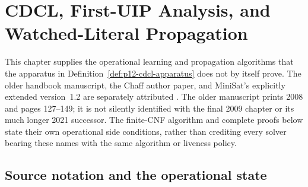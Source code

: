 \chapter{CDCL, First-UIP Analysis, and Watched-Literal Propagation}
\label{sec:p12-cdcl-uip-and-watched-literals}

This chapter supplies the operational learning and propagation algorithms that
the apparatus in Definition~\ref{def:p12-cdcl-apparatus} does not by itself
prove.  The older handbook manuscript, the Chaff author paper, and MiniSat's
explicitly extended version~1.2 are separately attributed
\cite{MarquesSilvaLynceMalik2008CDCLManuscript,MoskewiczEtAl2001ChaffV56,EenSorenssonMiniSatExtended12}.
The older manuscript prints 2008 and pages 127--149; it is not silently
identified with the final 2009 chapter or its much longer 2021 successor.
The finite-CNF algorithm and complete proofs below state their own operational
side conditions, rather than crediting every solver bearing these names with
the same algorithm or liveness policy.

\section{Source notation and the operational state}


